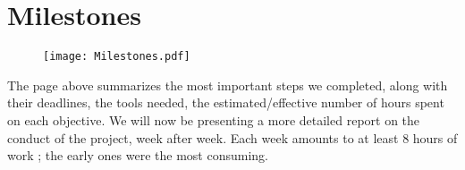 
\chapter{Milestones} %

\label{Chapter4} %

\begin{figure}[H]
    \centering
    \texttt{[image: Milestones.pdf]}
\end{figure}

The page above summarizes the most important steps we completed, along with their deadlines, the tools needed, the estimated/effective number of hours spent on each objective. We will now be presenting a more detailed report on the conduct of the project, week after week. Each week amounts to at least 8 hours of work ; the early ones were the most consuming. 


